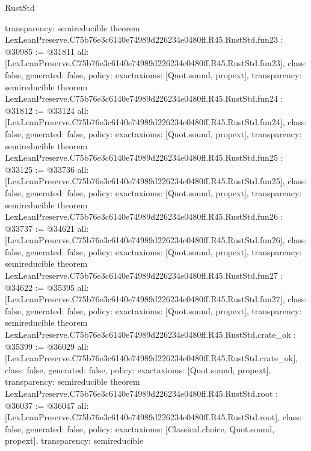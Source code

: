 \begin{lexlean}{RustStd}
\begin{coremodule}
{  transparency: semireducible
}
theorem LexLeanPreserve.C75b76e3c6140e74989d226234e0480ff.R45.RustStd.fun23 : @30985 := @31811 {
  all: [LexLeanPreserve.C75b76e3c6140e74989d226234e0480ff.R45.RustStd.fun23],
  class: false,
  generated: false,
  policy: exact{axioms: [Quot.sound, propext]},
  transparency: semireducible
}
theorem LexLeanPreserve.C75b76e3c6140e74989d226234e0480ff.R45.RustStd.fun24 : @31812 := @33124 {
  all: [LexLeanPreserve.C75b76e3c6140e74989d226234e0480ff.R45.RustStd.fun24],
  class: false,
  generated: false,
  policy: exact{axioms: [Quot.sound, propext]},
  transparency: semireducible
}
theorem LexLeanPreserve.C75b76e3c6140e74989d226234e0480ff.R45.RustStd.fun25 : @33125 := @33736 {
  all: [LexLeanPreserve.C75b76e3c6140e74989d226234e0480ff.R45.RustStd.fun25],
  class: false,
  generated: false,
  policy: exact{axioms: [Quot.sound, propext]},
  transparency: semireducible
}
theorem LexLeanPreserve.C75b76e3c6140e74989d226234e0480ff.R45.RustStd.fun26 : @33737 := @34621 {
  all: [LexLeanPreserve.C75b76e3c6140e74989d226234e0480ff.R45.RustStd.fun26],
  class: false,
  generated: false,
  policy: exact{axioms: [Quot.sound, propext]},
  transparency: semireducible
}
theorem LexLeanPreserve.C75b76e3c6140e74989d226234e0480ff.R45.RustStd.fun27 : @34622 := @35395 {
  all: [LexLeanPreserve.C75b76e3c6140e74989d226234e0480ff.R45.RustStd.fun27],
  class: false,
  generated: false,
  policy: exact{axioms: [Quot.sound, propext]},
  transparency: semireducible
}
theorem LexLeanPreserve.C75b76e3c6140e74989d226234e0480ff.R45.RustStd.crate_ok : @35399 := @36029 {
  all: [LexLeanPreserve.C75b76e3c6140e74989d226234e0480ff.R45.RustStd.crate_ok],
  class: false,
  generated: false,
  policy: exact{axioms: [Quot.sound, propext]},
  transparency: semireducible
}
theorem LexLeanPreserve.C75b76e3c6140e74989d226234e0480ff.R45.RustStd.root : @36037 := @36047 {
  all: [LexLeanPreserve.C75b76e3c6140e74989d226234e0480ff.R45.RustStd.root],
  class: false,
  generated: false,
  policy: exact{axioms: [Classical.choice, Quot.sound, propext]},
  transparency: semireducible
}


\end{coremodule}
\end{lexlean}
